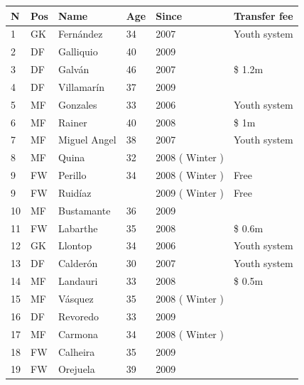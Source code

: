 \documentclass{article}
\begin{document}
\begin{tabular}{llllll}
\toprule
N & Pos & Name & Age & Since & Transfer fee \\
\midrule
1 & GK & Fernández & 34 & 2007 & Youth system \\
2 & DF & Galliquio & 40 & 2009 &  \\
3 & DF & Galván & 46 & 2007 & \$ 1.2m \\
4 & DF & Villamarín & 37 & 2009 &  \\
5 & MF & Gonzales & 33 & 2006 & Youth system \\
6 & MF & Rainer & 40 & 2008 & \$ 1m \\
7 & MF & Miguel Angel & 38 & 2007 & Youth system \\
8 & MF & Quina & 32 & 2008 ( Winter ) &  \\
9 & FW & Perillo & 34 & 2008 ( Winter ) & Free \\
9 & FW & Ruidíaz &  & 2009 ( Winter ) & Free \\
10 & MF & Bustamante & 36 & 2009 &  \\
11 & FW & Labarthe & 35 & 2008 & \$ 0.6m \\
12 & GK & Llontop & 34 & 2006 & Youth system \\
13 & DF & Calderón & 30 & 2007 & Youth system \\
14 & MF & Landauri & 33 & 2008 & \$ 0.5m \\
15 & MF & Vásquez & 35 & 2008 ( Winter ) &  \\
16 & DF & Revoredo & 33 & 2009 &  \\
17 & MF & Carmona & 34 & 2008 ( Winter ) &  \\
18 & FW & Calheira & 35 & 2009 &  \\
19 & FW & Orejuela & 39 & 2009 &  \\
\bottomrule
\end{tabular}
\end{document}
